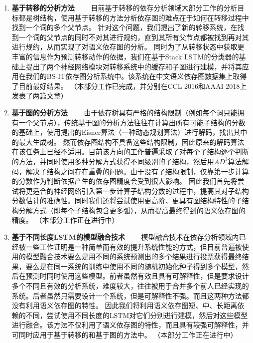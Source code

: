 \begin{enumerate}
	\item \textbf{基于转移的分析方法}
	\ \ \ \ 目前基于转移的依存分析领域大部分工作的分析目标都是树结构，使用基于转移的方法分析依存图的难点在于如何在转移过程中找到一个词的多个父节点。
	针对这个问题，我们提出了新的转移系统，在找到一个词的父节点的同时不对其进行规约，直到其所有父节点都被找到再对其进行规约，从而实现了对语义依存图的分析。
	同时为了从转移状态中获取更丰富的信息作为预测转移动作的依据，我们在基于Stack LSTM的分类器的基础上提出了两个神经网络模块对转移系统中的缓存和子图进行建模，并将其应用在我们的BS-IT依存图分析系统中。该系统在中文语义依存图数据集上取得了目前最好结果。
	（本部分工作已完成，并分别在CCL 2016和AAAI 2018上发表了两篇文章）
	
	\item \textbf{基于图的分析方法}
	\ \ \ \ 由于依存树具有严格的结构限制（例如每个词只能拥有一个父节点），传统基于图的分析方法往往在计算出所有可能子结构的分数的基础上，使用提出的Eisner算法（一种动态规划算法）进行解码，找出其中的最大生成树。
	然而依存图结构不具备这些结构限制，因此原来的解码算法在该任务上已经不适用。目前该方向的工作普遍采取了对每个子结构逐个判断的方法，并同时使用多种分解方式获得不同级别的子结构，然后用$AD^3$算法解码，解决子结构之间存在重叠的问题。由于没有了结构限制，仅靠第一步计算的分数作为判断依据产生的依存图精度会受到很大影响。
	因此我们首先将尝试将更适合的神经网络引入第一步计算子结构分数的过程中，提高其对子结构分数估计的准确性。同时我们还将尝试使用更高阶、更具有图结构特性的子结构分解方式（即每个子结构包含更多弧），从而提高最终得到的语义依存图的精度。
	（本部分工作正在进行中）
	
	\item \textbf{基于不同长度LSTM的模型融合技术}
	\ \ \ \ 模型融合技术在依存分析领域内已经被一些工作证明是一种简单而有效的提升系统性能的方式，但目前普遍被使用的模型融合技术要么是用不同的系统预测出的多个结果进行投票获得最终结果，要么是在同一系统的训练中使用不同的随机初始化种子得到多个模型，然后在预测时同时使用这些模型。前者虽然有效且具有可解释性，但是要求设计多个不同且有效的分析系统，难度较大，往往被用于合并多个前人已经实现的系统。后者虽然只需要设计一个系统，但是可解释性不强。而且这两种方法都没有利用语义依存图的特性。
	因此我们将利用语义依存图短、中、长距离依赖的不同，尝试使用不同长度的LSTM对它们分别进行建模，然后对这些模型进行融合。该方法不仅利用了语义依存图的特性，而且具有较强可解释性，并可同时应用于基于转移的和基于图的方法中。
	（本部分工作正在进行中）
	

\end{enumerate}
